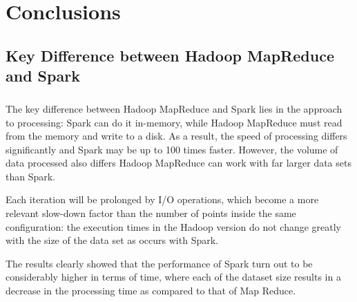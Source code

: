 \documentclass{book}
\begin{document}
\chapter{Conclusions}\label{chap:experimental}
    \section{Key Difference between Hadoop MapReduce and Spark}
    \paragraph{}

	The key difference between Hadoop MapReduce and Spark lies in the approach to processing: Spark can do it in-memory, while Hadoop MapReduce must read from the memory and write to a disk. As a result, the speed of processing differs significantly and Spark may be up to 100 times faster. However, the volume of data processed also differs Hadoop MapReduce can work with far larger data sets than Spark. 

    Each iteration will be prolonged by I/O operations, which become a more relevant slow-down factor than the number of points inside the same configuration: the execution times in the Hadoop version do not change greatly with the size of the data set as occurs with Spark. 

    The results clearly showed that the performance of Spark turn out to be considerably higher in terms of time, where each of the dataset size results in a decrease in the processing time as compared to that of Map Reduce. 


    \printbibliography
\end{document}
